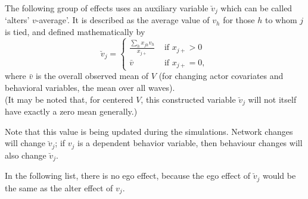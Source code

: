 \documentclass[a4paper,fleqn,11pt]{article}
\newcommand{\+}{\, + \,}
\begin{document}
\noindent
The following group of effects uses an auxiliary variable $\breve v_j$ which
can be called `alters' $v$-average'.
It is described as the average value of $v_h$ for those $h$
to whom $j$ is tied, and defined mathematically by
\begin{equation}
  \breve v_j = \left\{\begin{array}{ll} \displaystyle
         \frac{\sum_h x_{jh}v_h}{x_{j+}}  &  \text{ if } x_{j+} > 0     \\
         \bar v                                &  \text{ if } x_{j+} = 0  ,
  \end{array}   \right.            \label{alt_av}
\end{equation}
where $\bar v$ is the overall observed mean of $V$ (for changing
actor covariates and behavioral variables, the mean over all waves).\\
(It may be noted that, for centered $V$, this constructed variable $\breve v_j$
will not itself have exactly a zero mean generally.)

Note that this value is being updated during the simulations.
Network changes will change $\breve v_j$; if $v_j$ is a dependent behavior
variable, then behaviour changes will also change $\breve v_j$.

In the following list, there is no ego effect, because the ego effect
of $\breve v_j$ would be the same as the alter effect of $v_j$.
\end{document}
